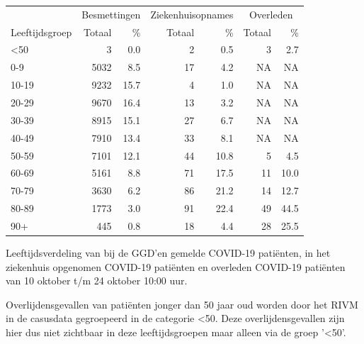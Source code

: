 \documentclass[
  english,
  man,floatsintext]{apa6}
\begin{document}
\begin{table}
\centering\begingroup\fontsize{11}{13}\selectfont

\begin{threeparttable}
\begin{tabular}{lrrrrrr}
\toprule
\multicolumn{1}{c}{ } & \multicolumn{2}{c}{Besmettingen} & \multicolumn{2}{c}{Ziekenhuisopnames} & \multicolumn{2}{c}{Overleden} \\
\cmidrule(l{3pt}r{3pt}){2-3} \cmidrule(l{3pt}r{3pt}){4-5} \cmidrule(l{3pt}r{3pt}){6-7}
Leeftijdsgroep & Totaal & \% & Totaal & \% & Totaal & \%\\
\midrule
<50 & 3 & 0.0 & 2 & 0.5 & 3 & 2.7\\
0-9 & 5032 & 8.5 & 17 & 4.2 & NA & NA\\
10-19 & 9232 & 15.7 & 4 & 1.0 & NA & NA\\
20-29 & 9670 & 16.4 & 13 & 3.2 & NA & NA\\
30-39 & 8915 & 15.1 & 27 & 6.7 & NA & NA\\
40-49 & 7910 & 13.4 & 33 & 8.1 & NA & NA\\
50-59 & 7101 & 12.1 & 44 & 10.8 & 5 & 4.5\\
60-69 & 5161 & 8.8 & 71 & 17.5 & 11 & 10.0\\
70-79 & 3630 & 6.2 & 86 & 21.2 & 14 & 12.7\\
80-89 & 1773 & 3.0 & 91 & 22.4 & 49 & 44.5\\
90+ & 445 & 0.8 & 18 & 4.4 & 28 & 25.5\\
\bottomrule
\end{tabular}
\begin{tablenotes}
\item[1] Leeftijdsverdeling van bij de GGD’en gemelde COVID-19 patiënten, in het ziekenhuis opgenomen COVID-19 patiënten en overleden COVID-19 patiënten van 10 oktober t/m 24 oktober 10:00 uur.
\item[2] Overlijdensgevallen van patiënten jonger dan 50 jaar oud worden door het RIVM in de casusdata gegroepeerd in de categorie <50. Deze overlijdensgevallen zijn hier dus niet zichtbaar in deze leeftijdsgroepen maar alleen via de groep '<50'.
\end{tablenotes}
\end{threeparttable}
\endgroup{}
\end{table}

\newpage
\end{document}
